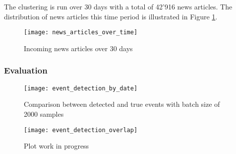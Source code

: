 The clustering is run over 30 days with a total of 42'916 news articles. The distribution of news articles this time period is illustrated in Figure \ref{fig:news_articles_over_time}.

\begin{figure}[h]
    \centering
    \texttt{[image: news\_articles\_over\_time]}
    \caption{Incoming news articles over 30 days}
    \label{fig:news_articles_over_time}
\end{figure}

\subsubsection{Evaluation}




\begin{figure}[h]
    \centering
    \texttt{[image: event\_detection\_by\_date]}
    \caption{Comparison between detected and true events with batch size of 2000 samples}
    \label{fig:event_detection_by_date}
\end{figure}

\begin{figure}[h]
    \centering
    \texttt{[image: event\_detection\_overlap]}
    \caption{Plot work in progress}
    \label{fig:event_detection_overlap}
\end{figure}

